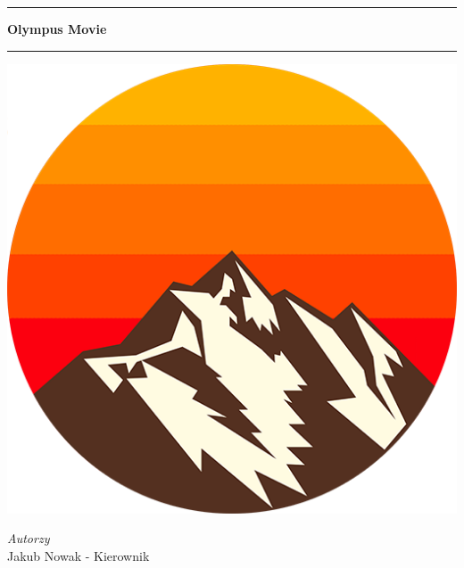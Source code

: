 \documentclass[12pt]{article}
\begin{document}
\begin{titlepage} %
	
	\center %
	
	
	\rule[1.0cm]{\textwidth}{1.0mm}
	
	{\huge\bfseries Olympus Movie}\\[0.5cm]
	
	\rule[1.5cm]{\textwidth}{1.0mm}
	
	
	\includegraphics[scale=0.5]{logo.png}\\[1cm]
	
	
	
	\begin{minipage}{0.4\textwidth}
		\begin{flushright}
			\large
			\textit{Autorzy}\\
			Jakub Nowak - Kierownik
			

\end{flushright}
\end{minipage}
\end{titlepage}
\end{document}
